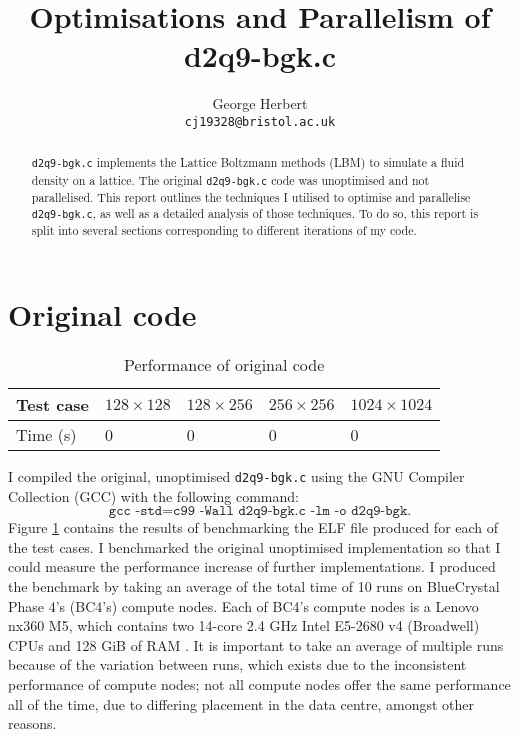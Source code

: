 \documentclass[11pt, a4paper]{article}
\author{
    George Herbert\\
    \texttt{cj19328@bristol.ac.uk}
}
\title{Optimisations and Parallelism of d2q9-bgk.c}
\begin{document}
\maketitle

\begin{abstract}
    \texttt{d2q9-bgk.c} implements the Lattice Boltzmann methods (LBM) to simulate a fluid density on a lattice.
    The original \texttt{d2q9-bgk.c} code was unoptimised and not parallelised.
    This report outlines the techniques I utilised to optimise and parallelise \texttt{d2q9-bgk.c}, as well as a detailed analysis of those techniques.
    To do so, this report is split into several sections corresponding to different iterations of my code.
\end{abstract}

\section{Original code}

\begin{table}[htbp]
    \begin{center}
    \caption{Performance of original code}\label{tab:original}
    \begin{tabular}{l | l l l l} 
        \hline\hline
        Test case&$128 \times 128$&$128 \times 256$&$256 \times 256$&$1024 \times 1024$\\
        \hline
        Time (s)&0&0&0&0\\
        \hline
      \end{tabular}
    \end{center}
\end{table} 

I compiled the original, unoptimised \texttt{d2q9-bgk.c} using the GNU Compiler Collection (GCC) with the following command:
\[
    \texttt{gcc -std=c99 -Wall d2q9-bgk.c -lm -o d2q9-bgk}.
\]
Figure \ref{tab:original} contains the results of benchmarking the ELF file produced for each of the test cases.
I benchmarked the original unoptimised implementation so that I could measure the performance increase of further implementations.
I produced the benchmark by taking an average of the total time of 10 runs on BlueCrystal Phase 4's (BC4's) compute nodes.
Each of BC4's compute nodes is a Lenovo nx360 M5, which contains two 14-core 2.4 GHz Intel E5-2680 v4 (Broadwell) CPUs and 128 GiB of RAM \cite{bcp4}.
It is important to take an average of multiple runs because of the variation between runs, which exists due to the inconsistent performance of compute nodes; not all compute nodes offer the same performance all of the time, due to differing placement in the data centre, amongst other reasons.
\end{document}
